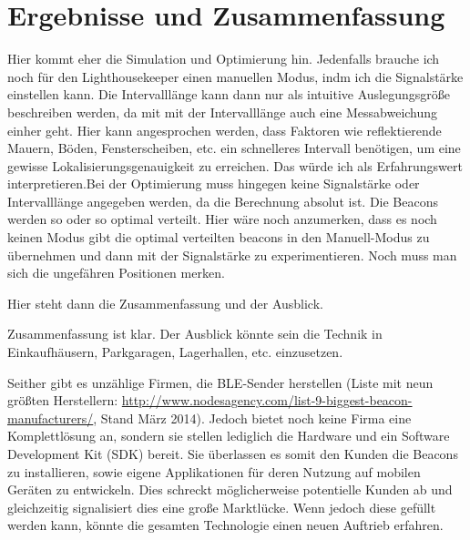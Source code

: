 \chapter{Ergebnisse und Zusammenfassung}
Hier kommt eher die Simulation und Optimierung hin. Jedenfalls brauche ich noch für den Lighthousekeeper einen manuellen Modus, indm ich die Signalstärke einstellen kann. Die Intervalllänge kann dann nur als intuitive Auslegungsgröße beschreiben werden, da mit mit der Intervalllänge auch eine Messabweichung einher geht. Hier kann angesprochen werden, dass Faktoren wie reflektierende Mauern, Böden, Fensterscheiben, etc. ein schnelleres Intervall benötigen, um eine gewisse Lokalisierungsgenauigkeit zu erreichen. Das würde ich als Erfahrungswert interpretieren.Bei der Optimierung muss hingegen keine Signalstärke oder Intervalllänge angegeben werden, da die Berechnung absolut ist. Die Beacons werden so oder so optimal verteilt. Hier wäre noch anzumerken, dass es noch keinen Modus gibt die optimal verteilten beacons in den Manuell-Modus zu übernehmen und dann mit der Signalstärke zu experimentieren. Noch muss man sich die ungefähren Positionen merken.






Hier steht dann die Zusammenfassung und der Ausblick.


Zusammenfassung ist klar. Der Ausblick könnte sein die Technik in Einkaufhäusern, Parkgaragen, Lagerhallen, etc. einzusetzen. 

Seither gibt es unzählige Firmen, die BLE-Sender herstellen (Liste mit neun größten Herstellern: \url{http://www.nodesagency.com/list-9-biggest-beacon-manufacturers/}, Stand März 2014). Jedoch bietet noch keine Firma eine Komplettlösung an, sondern sie stellen lediglich die Hardware und ein Software Development Kit (SDK) bereit. Sie überlassen es somit den Kunden die Beacons zu installieren, sowie eigene Applikationen für deren Nutzung auf mobilen Geräten zu entwickeln. Dies schreckt möglicherweise potentielle Kunden ab und gleichzeitig signalisiert dies eine große Marktlücke. Wenn jedoch diese gefüllt werden kann, könnte die gesamten Technologie einen neuen Auftrieb erfahren.

